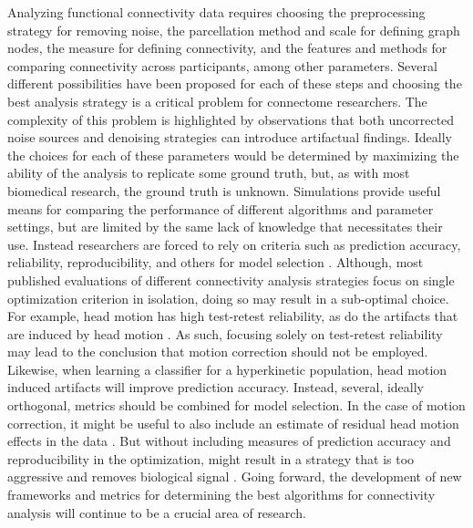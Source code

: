 \documentclass{bmcart}
\begin{document}
Analyzing functional connectivity data requires choosing the preprocessing strategy for removing noise, the parcellation method and scale for defining graph nodes, the measure for defining connectivity, and the features and methods for comparing connectivity across participants, among other parameters. Several different possibilities have been proposed for each of these steps and choosing the best analysis strategy is a critical problem for connectome researchers. The complexity of this problem is highlighted by observations that both uncorrected noise sources \cite{Birn2012, Power2012, VanDijk2012, yan2013comprehensive, satterthwaite2012impact} and denoising strategies \cite{Murphy2009, Saad2012} can introduce artifactual findings. Ideally the choices for each of these parameters would be determined by maximizing the ability of the analysis to replicate some ground truth, but, as with most biomedical research, the ground truth is unknown. Simulations provide useful means for comparing the performance of different algorithms and parameter settings, but are limited by the same lack of knowledge that necessitates their use. Instead researchers are forced to rely on criteria such as prediction accuracy, reliability, reproducibility, and others for model selection \cite{strother2006}. Although, most published evaluations of different connectivity analysis strategies focus on single optimization criterion in isolation, doing so may result in a sub-optimal choice. For example, head motion has high test-retest reliability, as do the artifacts that are induced by head motion \cite{yan2013comprehensive}. As such, focusing solely on test-retest reliability may lead to the conclusion that motion correction should not be employed. Likewise, when learning a classifier for a hyperkinetic population, head motion induced artifacts will improve prediction accuracy\cite{satterthwaite2012improved}. Instead, several, ideally orthogonal, metrics should be combined for model selection. In the case of motion correction, it might be useful to also include an estimate of residual head motion effects in the data \cite{Power2012, VanDijk2012, yan2013comprehensive, satterthwaite2012impact}. But without including measures of prediction accuracy and reproducibility in the optimization, might result in a strategy that is too aggressive and removes biological signal  \cite{laconte2003evaluation, strother2002quantitative}. Going forward, the development of new frameworks and metrics for determining the best algorithms for connectivity analysis will continue to be a crucial area of research. 
\end{document}
